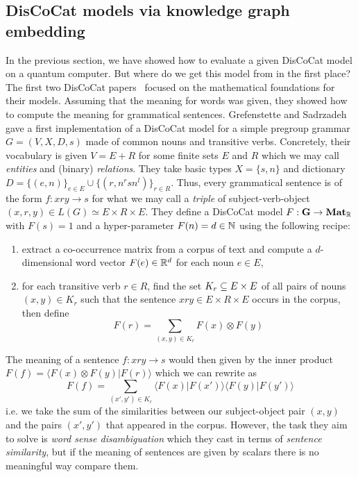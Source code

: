 
\subsection{DisCoCat models via knowledge graph embedding}\label{subsection:kge}

In the previous section, we have showed how to evaluate a given DisCoCat model on a quantum computer.
But where do we get this model from in the first place?
The first two DisCoCat papers~\cite{ClarkEtAl08,ClarkEtAl10} focused on the mathematical foundations for their models.
Assuming that the meaning for words was given, they showed how to compute the meaning for grammatical sentences.
Grefenstette and Sadrzadeh~\cite{GrefenstetteSadrzadeh11} gave a first implementation of a DisCoCat model for a simple pregroup grammar $G = (V, X, D, s)$ made of common nouns and transitive verbs.
Concretely, their vocabulary is given $V = E + R$ for some finite sets $E$ and $R$ which we may call \emph{entities} and (binary) \emph{relations}.
They take basic types $X = \{ s, n \}$ and dictionary $D = \{ (e, n) \}_{e \in E} \cup \{ (r, n^r s n^l) \}_{r \in R}$.
Thus, every grammatical sentence is of the form $f : x r y \to s$ for what we may call a \emph{triple} of subject-verb-object $(x, r, y) \in L(G) \simeq E \times R \times E$.
They define a DisCoCat model $F : \mathbf{G} \to \mathbf{Mat}_{\mathbb{R}}$ with $F(s) = 1$ and a hyper-parameter $F(n) = d \in \mathbb{N}$ using the following recipe:
\begin{enumerate}
\item extract a co-occurrence matrix from a corpus of text and compute a $d$-dimensional word vector $F(e) \in \mathbb{R}^d$ for each noun $e \in E$,
\item for each transitive verb $r \in R$, find the set $K_r \subseteq E \times E$ of all pairs of nouns $(x, y) \in K_r$ such that the sentence $x r y \in E \times R \times E$ occurs in the corpus, then define
$$F(r) = \sum_{(x, y) \in K_r} F(x) \otimes F(y)$$
\end{enumerate}
The meaning of a sentence $f : x r y \to s$ would then given by the inner product $F(f) = \langle F(x) \otimes F(y) \vert F(r) \rangle$ which we can rewrite as
$$F(f) = \sum_{(x', y') \in K_r} \langle F(x) \vert F(x') \rangle \langle F(y) \vert F(y') \rangle$$
i.e. we take the sum of the similarities between our subject-object pair $(x, y)$ and the pairs $(x', y')$ that appeared in the corpus.
However, the task they aim to solve is \emph{word sense disambiguation} which they cast in terms of \emph{sentence similarity}, but if the meaning of sentences are given by scalars there is no meaningful way compare them.

